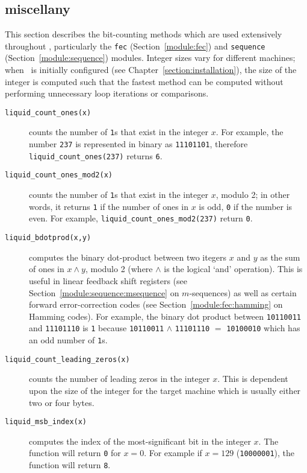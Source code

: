\subsection{miscellany}
\label{module:utility:misc}
This section describes the bit-counting methods which are used extensively
throughout \liquid, particularly the
{\tt fec} (Section~\ref{module:fec}) and
{\tt sequence} (Section~\ref{module:sequence}) modules.
Integer sizes vary for different machines;
when \liquid\ is initially configured (see Chapter~\ref{section:installation}), the
size of the integer is computed such that the fastest method can be computed
without performing unnecessary loop iterations or comparisons.

\begin{description}
\item[{\tt liquid\_count\_ones(x)}]
    counts the number of {\tt 1}s that exist in the integer $x$.
    For example, the number {\tt 237} is represented in binary as
    {\tt 11101101}, therefore {\tt liquid\_count\_ones(237)} returns {\tt 6}.
\item[{\tt liquid\_count\_ones\_mod2(x)}]
    counts the number of {\tt 1}s that exist in the integer $x$, modulo 2; in
    other words, it returns {\tt 1} if the number of ones in $x$ is odd,
    {\tt 0} if the number is even.
    For example, {\tt liquid\_count\_ones\_mod2(237)} return {\tt 0}.
\item[{\tt liquid\_bdotprod(x,y)}]
    computes the binary dot-product between two itegers $x$ and $y$ as the sum
    of ones in $x \land y$, modulo 2 (where $\land$ is the logical `and'
    operation).
    This is useful in linear feedback shift registers
    (see Section~\ref{module:sequence:msequence} on $m$-sequences)
    as well as certain forward error-correction codes
    (see Section~\ref{module:fec:hamming} on Hamming codes).
    For example, the binary dot product between
    {\tt 10110011} and
    {\tt 11101110} is
    {\tt 1} because
    {\tt 10110011} $\land$ {\tt 11101110} $=$ {\tt 10100010} which has an odd
    number of {\tt 1}s.
\item[{\tt liquid\_count\_leading\_zeros(x)}]
    counts the number of leading zeros in the integer $x$.
    This is dependent upon the size of the integer for the target machine
    which is usually either two or four bytes.
\item[{\tt liquid\_msb\_index(x)}]
    computes the index of the most-significant bit in the integer $x$.
    The function will return {\tt 0} for $x=0$.
    For example if $x=129$ ({\tt 10000001}), the function will return {\tt 8}.
\end{description}


